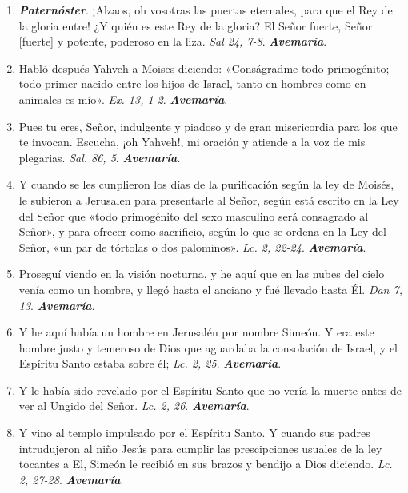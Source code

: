 \documentclass[./rosary.tex]{subfiles}
\begin{document}
\begin{enumerate}
      \item \textbf{\emph{Paternóster}}. ¡Alzaos, oh vosotras las puertas eternales, para que el Rey de la gloria entre!
            ¿Y quién es este Rey de la gloria? El Señor fuerte, Señor [fuerte] y potente, poderoso en la liza. \emph{Sal 24, 7-8}. \textbf{\emph{Avemaría}}.

      \item Habló después Yahveh a Moises diciendo: «Conságradme todo primogénito; todo primer nacido entre los hijos de Israel, tanto en hombres como en animales es mío».
            \emph{Ex. 13, 1-2}. \textbf{\emph{Avemaría}}.

      \item Pues tu eres, Señor, indulgente y piadoso y de gran misericordia para los que te invocan. Escucha, ¡oh Yahveh!, mi oración y atiende a la voz de mis plegarias.
            \emph{Sal. 86, 5}. \textbf{\emph{Avemaría}}.

      \item Y cuando se les cunplieron los días de la purificación según la ley de Moisés, le subieron a Jerusalen para presentarle al Señor,
            según está escrito en la Ley del Señor que «todo primogénito del sexo masculino será consagrado al Señor»,
            y para ofrecer como sacrificio, según lo que se ordena en la Ley del Señor, «un par de tórtolas o dos palominos». \emph{Lc. 2, 22-24}. \textbf{\emph{Avemaría}}.

      \item Proseguí viendo en la visión nocturna, y he aquí que en las nubes del cielo venía como un hombre, y llegó hasta el anciano y fué llevado hasta Él.
            \emph{Dan 7, 13}. \textbf{\emph{Avemaría}}.

      \item Y he aquí había un hombre en Jerusalén por nombre Simeón. Y era este hombre justo y temeroso de Dios que aguardaba la consolación de Israel,
            y el Espíritu Santo estaba sobre él; \emph{Lc. 2, 25}. \textbf{\emph{Avemaría}}.

      \item Y le había sido revelado por el Espíritu Santo que no vería la muerte antes de ver al Ungido del Señor. \emph{Lc. 2, 26}. \textbf{\emph{Avemaría}}.

      \item Y vino al templo impulsado por el Espíritu Santo. Y cuando sus padres intrudujeron al niño Jesús para cumplir
            las prescipciones usuales de la ley tocantes a El, Simeón le recibió en sus brazos y bendijo a Dios diciendo. \emph{Lc. 2, 27-28}. \textbf{\emph{Avemaría}}.


\end{enumerate}
\end{document}
